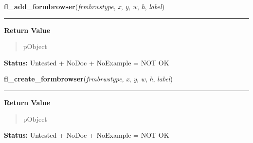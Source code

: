    \label{xformslib:library:fl_add_formbrowser}

    \vspace{0.5ex}

\hspace{.8\funcindent}\begin{boxedminipage}{\funcwidth}

    \raggedright \textbf{fl\_add\_formbrowser}(\textit{frmbrwstype}, \textit{x}, \textit{y}, \textit{w}, \textit{h}, \textit{label})

    \vspace{-1.5ex}

    \rule{\textwidth}{0.5\fboxrule}
\setlength{\parskip}{2ex}
\setlength{\parskip}{1ex}
      \textbf{Return Value}
    \vspace{-1ex}

      \begin{quote}
      pObject

      \end{quote}

\textbf{Status:} Untested + NoDoc + NoExample = NOT OK



    \end{boxedminipage}

    \label{xformslib:library:fl_create_formbrowser}

    \vspace{0.5ex}

\hspace{.8\funcindent}\begin{boxedminipage}{\funcwidth}

    \raggedright \textbf{fl\_create\_formbrowser}(\textit{frmbrwstype}, \textit{x}, \textit{y}, \textit{w}, \textit{h}, \textit{label})

    \vspace{-1.5ex}

    \rule{\textwidth}{0.5\fboxrule}
\setlength{\parskip}{2ex}
\setlength{\parskip}{1ex}
      \textbf{Return Value}
    \vspace{-1ex}

      \begin{quote}
      pObject

      \end{quote}

\textbf{Status:} Untested + NoDoc + NoExample = NOT OK



    \end{boxedminipage}

